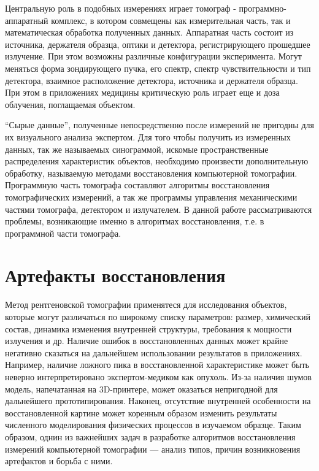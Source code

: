 Центральную роль в подобных измерениях играет томограф - программно-аппаратный комплекс, в котором совмещены как измерительная часть, так и математическая обработка полученных данных.
Аппаратная часть состоит из источника, держателя образца, оптики и детектора, регистрирующего прошедшее излучение. 
При этом возможны различные конфигурации эксперимента. 
Могут меняться форма зондирующего пучка, его спектр, спектр чувствительности и тип детектора, взаимное расположение детектора, источника и держателя образца.
При этом в приложениях медицины критическую роль играет еще и доза облучения, поглащаемая объектом.

``Сырые данные'', полученные непосредственно после измерений не пригодны для их визуального анализа экспертом.
Для того чтобы получить из измеренных данных, так же называемых синограммой, искомые пространственные распределения характеристик объектов, необходимо произвести дополнительную обработку, называемую методами восстановления компьютерной томографии.
Программную часть томографа составляют алгоритмы восстановления томографических измерений, а так же программы управления механическими частями томографа, детектором и излучателем.
В данной работе рассматриваются проблемы, возникающие именно в алгоритмах восстановления, т.е. в программной части томографа.

\section{Артефакты восстановления}

Метод рентгеновской томографии применятеся для исследования объектов, которые могут различаться по широкому списку параметров: размер, химический состав, динамика изменения внутренней структуры, требования к мощности излучения и др.
Наличие ошибок в восстановленных данных может крайне негативно сказаться на дальнейшем использовании результатов в приложениях.
Например, наличие ложного пика в восстановленной характеристике может быть неверно интерпретировано экспертом-медиком как опухоль.
Из-за наличия шумов модель, напечатанная на 3D-принтере, может оказаться непригодной для дальнейшего прототипирования.
Наконец, отсутствие внутренней особенности на восстановленной картине может коренным образом изменить результаты численного моделирования физических процессов в изучаемом образце.
Таким образом, однин из важнейших задач в разработке алгоритмов восстановления измерений компьютерной томографии --- анализ типов, причин возникновения артефактов и борьба с ними.

